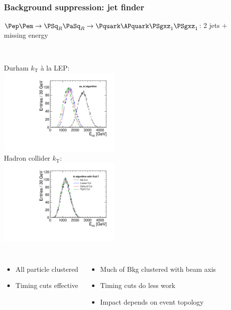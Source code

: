 \documentclass{beamer}
\begin{document}
\begin{frame}
\frametitle{Background suppression: jet finder}
$\Pep\Pem\to\PSq_R\PaSq_R\to\Pquark\APquark\PSgxz_1 \PSgxz_1$: 2 jets $+$
missing energy\\ ~\\
\begin{columns}[c]
\column{6cm}
Durham $k_{\textrm{T}}$ \`a la LEP:\\
\includegraphics[width=6cm]{JetFinding_compare_E_vis__FJ_ee_kt_algorithm_ExclusiveNJets_2.pdf}\\
\column{6cm}
Hadron collider $k_{\textrm{T}}$:\\
\includegraphics[width=6cm]{JetFinding_compare_E_vis__FJ_kt_algorithm_0_7_ExclusiveNJets_2.pdf}\\
\end{columns}
\begin{columns}
\column{6cm}
{\scriptsize
\begin{itemize}
  \item All particle clustered
  \item Timing cuts effective
\end{itemize}
}
\column{6cm}
{\scriptsize
\begin{itemize}
  \item Much of Bkg clustered with beam axis
  \item Timing cuts do less work
  \item Impact depends on event topology
\end{itemize}
}
\end{columns}
\end{frame}
\end{document}
